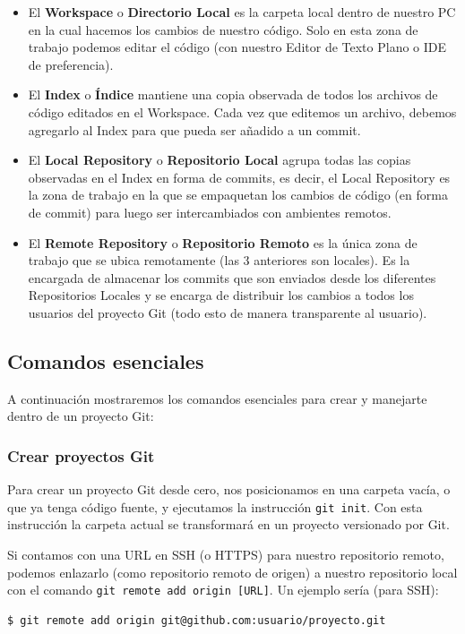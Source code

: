 \documentclass{article}
\begin{document}
\begin{itemize}
\item El \textbf{Workspace} o \textbf{Directorio Local} es la carpeta local dentro de nuestro PC en la cual hacemos los cambios de nuestro código. Solo en esta zona de trabajo podemos editar el código (con nuestro Editor de Texto Plano o IDE de preferencia).
\item El \textbf{Index} o \textbf{Índice} mantiene una copia observada de todos los archivos de código editados en el Workspace. Cada vez que editemos un archivo, debemos agregarlo al Index para que pueda ser añadido a un commit.
\item El \textbf{Local Repository} o \textbf{Repositorio Local} agrupa todas las copias observadas en el Index en forma de commits, es decir, el Local Repository es la zona de trabajo en la que se empaquetan los cambios de código (en forma de commit) para luego ser intercambiados con ambientes remotos.
\item El \textbf{Remote Repository} o \textbf{Repositorio Remoto} es la única zona de trabajo que se ubica remotamente (las 3 anteriores son locales). Es la encargada de almacenar los commits que son enviados desde los diferentes Repositorios Locales y se encarga de distribuir los cambios a todos los usuarios del proyecto Git (todo esto de manera transparente al usuario).
\end{itemize}

\subsection{Comandos esenciales}

A continuación mostraremos los comandos esenciales para crear y manejarte dentro de un proyecto Git:

\subsubsection{Crear proyectos Git}

Para crear un proyecto Git desde cero, nos posicionamos en una carpeta vacía, o que ya tenga código fuente, y ejecutamos la instrucción \texttt{git init}. Con esta instrucción la carpeta actual se transformará en un proyecto versionado por Git.

Si contamos con una URL en SSH (o HTTPS) para nuestro repositorio remoto, podemos enlazarlo (como repositorio remoto de origen) a nuestro repositorio local con el comando \texttt{git remote add origin [URL]}. Un ejemplo sería (para SSH):
\begin{verbatim}
$ git remote add origin git@github.com:usuario/proyecto.git
\end{verbatim}
\end{document}

